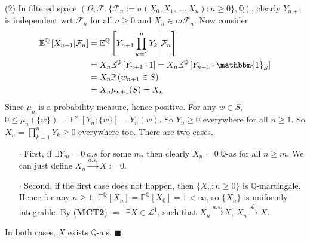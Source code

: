 \documentclass[a4paper,12pt,twoside]{book}
\begin{document}
\begin{itemize}
\begin{itemize}
	(2) In filtered space $(\Omega, \mathcal{F}, \{\mathcal{F}_n:=\sigma(X_0,X_1, ..., X_n):n\geq 0 \}, \mathbb{Q})$, clearly $Y_{n+1}$ is independent wrt $\mathcal{F}_n$ for all $n\geq 0$ and $X_n \in m \mathcal{F}_n$. Now consider
	\begin{equation}
		\begin{split}
			\mathbb{E}^{\mathbb{Q}}\left[X_{n+1}\middle|\mathcal{F}_n\right]&=\mathbb{E}^{\mathbb{Q}}\left[Y_{n+1}\prod_{k=1}^n Y_k\middle|\mathcal{F}_n\right]\\
			&= X_n \mathbb{E}^{\mathbb{Q}}\left[Y_{n+1}\cdot1\right]=X_n \mathbb{E}^{\mathbb{Q}}\left[Y_{n+1}\cdot \mathbbm{1}_{S}\right]\\
			& = X_n \mathbb{P}\left(w_{n+1}\in S\right) \\
			&= X_n \mu_{n+1}(S)=X_n
		\end{split}
	\end{equation}
	Since $\mu_n$ is a probability measure, hence positive. For any $w \in S$, $0\leq \mu_n(\{w\})=\mathbb{E}^{\nu_n}\left[Y_n;\{w\}\right]=Y_n(w)$. So $Y_n \geq 0$ everywhere for all $n\geq 1$. So $X_n=\prod_{k=1}^nY_k \geq 0$ everywhere too. \newline
	There are two cases. 
	\begin{itemize}
		\item[$\cdot$] First, if $\exists Y_m=0~a.s$ for some $m$, then clearly $X_n =0~\mathbb{Q}$-as for all $n\geq m$. We can just define $X_n \xrightarrow{a.s.} X:=0$.
		\item[$\cdot$] Second, if the first case does not happen, then $\{X_n: n\geq 0\}$ is $\mathbb{Q}$-martingale. Hence for any $n\geq1$, $\mathbb{E}^{\mathbb{Q}}\left[X_n\right]=\mathbb{E}^{\mathbb{Q}}\left[X_0\right]=1<\infty$, so $\{X_n\}$ is uniformly integrable. By (\textbf{MCT2}) $\Rightarrow$ $\exists X\in \mathcal{L}^1$, such that $X_n \xrightarrow{a.s.} X$, $X_n \xrightarrow{\mathcal{L}^1}X$.
	\end{itemize}
	In both cases, $X$ exists $\mathbb{Q}$-a.s. $\blacksquare$.


\end{itemize}
\end{itemize}
\end{document}
